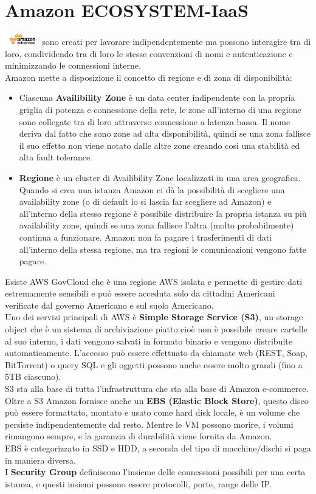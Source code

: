 \documentclass[11pt, twocolumn]{article}
\begin{document}
\section{Amazon ECOSYSTEM-IaaS}
\includegraphics[width=1.5cm,height=0.5cm]{imgs/AWSLogo.png} sono creati per lavorare indipendentemente ma possono interagire tra di loro, condividendo tra di loro le stesse convenzioni di nomi e autenticazione e minimizzando le connessioni interne.
\\
Amazon mette a disposizione il concetto di regione e di zona di disponibilità:
\begin{itemize}[noitemsep, topsep=0ex, wide]
	\item Ciascuna \textbf{Availibility Zone} è un data center indipendente con la propria griglia di potenza e connessione della rete, le zone all'interno di una regione sono collegate tra di loro attraverso connessione a latenza bassa. 
	Il nome deriva dal fatto che sono zone ad alta disponibilità, quindi se una zona fallisce il suo effetto non viene notato dalle altre zone creando così una stabilità ed alta fault tolerance.
	\item \textbf{Regione} è un cluster di Availibility Zone localizzati in una area geografica. 
	Quando si crea una istanza Amazon ci dà la possibilità di scegliere una availability zone (o di default lo si lascia far scegliere ad Amazon) e all'interno della stesso regione è possibile distribuire la propria istanza su più availability zone, quindi se una zona fallisce l'altra (molto probabilmente) continua a funzionare.
	Amazon non fa pagare i trasferimenti di dati all'interno della stessa regione, ma tra regioni le comunicazioni vengono fatte pagare.
\end{itemize}
Esiste AWS GovCloud che è una regione AWS isolata e permette di gestire dati estremamente sensibili e può essere acceduta solo da cittadini Americani verificate dal governo Americano e sul suolo Americano.\\
Uno dei servizi principali di AWS è \textbf{Simple Storage Service (S3)}, un storage object che è un sistema di archiviazione piatto cioè non è possibile creare cartelle al suo interno, i dati vengono salvati in formato binario e vengono distribuite automaticamente. 
L'accesso può essere effettuato da chiamate web (REST, Soap, BitTorrent) o query SQL e gli oggetti possono anche essere molto grandi (fino a 5TB ciascuno).\\
S3 sta alla base di tutta l'infrastruttura che sta alla base di Amazon e-commerce.
Oltre a S3 Amazon fornisce anche un \textbf{EBS (Elastic Block Store)}, questo disco può essere formattato, montato e usato come hard disk locale, è un volume che persiste indipendentemente dal resto.
Mentre le VM possono morire, i volumi rimangono sempre, e la garanzia di durabilità viene fornita da Amazon.\\
EBS è categorizzato in SSD e HDD, a seconda del tipo di macchine/dischi si paga in maniera diversa.\\
I \textbf{Security Group} definiscono l'insieme delle connessioni possibili per una certa istanza, e questi insiemi possono essere protocolli, porte, range delle IP.
\end{document}
